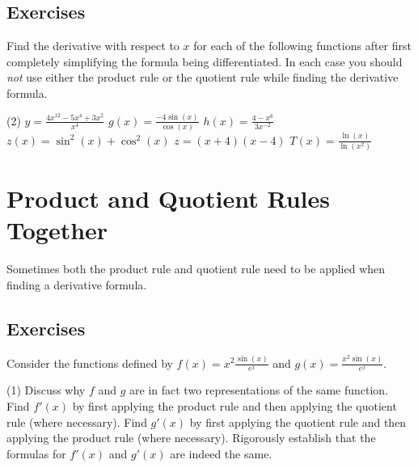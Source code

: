 \documentclass[12pt,]{book}
\theoremstyle{plain}
\theoremstyle{definition}
\numberwithin{equation}{section}
\newcommand{\fe}[2]{#1\mathopen{}\left(#2\right)\mathclose{}}
\newcommand{\fd}[1]{#1'}
\begin{document}
\subsection[Exercises]{Exercises}\label{exercises-39}
Find the derivative with respect to \(x\) for each of the following functions after first completely simplifying the formula being differentiated.  In each case you should \emph{not} use either the product rule or the quotient rule while finding the derivative formula.%
\par
\begin{exercisegroup}(2)
\exercise[1.]\hypertarget{exercise-385}{\null}\(y=\frac{4x^{12}-5x^4+3x^2}{x^4}\)%
\exercise[2.]\hypertarget{exercise-386}{\null}\(\fe{g}{x}=\frac{-4\fe{\sin}{x}}{\fe{\cos}{x}}\)%
\exercise[3.]\hypertarget{exercise-387}{\null}\(\fe{h}{x}=\frac{4-x^6}{3x^{-2}}\)%
\exercise[4.]\hypertarget{exercise-388}{\null}\(\fe{z}{x}=\fe{\sin^2}{x}+\fe{\cos^2}{x}\)%
\exercise[5.]\hypertarget{exercise-389}{\null}\(z=(x+4)(x-4)\)%
\exercise[6.]\hypertarget{exercise-390}{\null}\(\fe{T}{x}=\frac{\fe{\ln}{x}}{\fe{\ln}{x^2}}\)%
\end{exercisegroup}
\par\smallskip\noindent
\typeout{************************************************}
\typeout{************************************************}
\section[Product, Quotient Rules Together]{Product and Quotient Rules Together}\label{section-product-and-quotient-together}
Sometimes both the product rule and quotient rule need to be applied when finding a derivative formula.%
\typeout{************************************************}
\typeout{************************************************}
\subsection[Exercises]{Exercises}\label{exercises-40}
Consider the functions defined by \(\fe{f}{x}=x^2\frac{\fe{\sin}{x}}{e^x}\) and \(\fe{g}{x}=\frac{x^2\fe{\sin}{x}}{e^x}\).%
\par
\begin{exercisegroup}(1)
\exercise[1.]\hypertarget{exercise-391}{\null}Discuss why \(f\) and \(g\) are in fact two representations of the same function.%
\exercise[2.]\hypertarget{exercise-392}{\null}Find \(\fe{\fd{f}}{x}\) by first applying the product rule and then applying the quotient rule (where necessary).%
\exercise[3.]\hypertarget{exercise-393}{\null}Find \(\fe{\fd{g}}{x}\) by first applying the quotient rule and then applying the product rule (where necessary).%
\exercise[4.]\hypertarget{exercise-394}{\null}Rigorously establish that the formulas for \(\fe{\fd{f}}{x}\) and \(\fe{\fd{g}}{x}\) are indeed the same.%
\end{exercisegroup}
\par\smallskip\noindent
\typeout{************************************************}
\typeout{************************************************}
\end{document}
